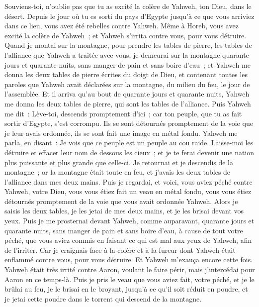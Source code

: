\begin{multicols}{2}
Souviens-toi, n'oublie pas que tu as excité la colère de Yahweh, ton Dieu, dans le désert. Depuis le jour où tu es sorti du pays d'Egypte jusqu'à ce que vous arriviez dans ce lieu, vous avez été rebelles contre Yahweh.
Même à Horeb, vous avez excité la colère de Yahweh~; et Yahweh s'irrita contre vous, pour vous détruire.
Quand je montai sur la montagne, pour prendre les tables de pierre, les tables de l'alliance que Yahweh a traitée avec vous, je demeurai sur la montagne quarante jours et quarante nuits, sans manger de pain et sans boire d'eau~;
et Yahweh me donna les deux tables de pierre écrites du doigt de Dieu, et contenant toutes les paroles que Yahweh avait déclarées sur la montagne, du milieu du feu, le jour de l'assemblée.
Et il arriva qu'au bout de quarante jours et quarante nuits, Yahweh me donna les deux tables de pierre, qui sont les tables de l'alliance.
Puis Yahweh me dit~: Lève-toi, descends promptement d'ici~; car ton peuple, que tu as fait sortir d'Egypte, s'est corrompu. Ils se sont détournés promptement de la voie que je leur avais ordonnée, ils se sont fait une image en métal fondu.
Yahweh me parla, en disant~: Je vois que ce peuple est un peuple au cou raide.
Laisse-moi les détruire et effacer leur nom de dessous les cieux~; et je te ferai devenir une nation plus puissante et plus grande que celle-ci.
Je retournai et je descendis de la montagne~; or la montagne était toute en feu, et j'avais les deux tables de l'alliance dans mes deux mains.
Puis je regardai, et voici, vous aviez péché contre Yahweh, votre Dieu, vous vous étiez fait un veau en métal fondu, vous vous étiez détournés promptement de la voie que vous avait ordonnée Yahweh.
Alors je saisis les deux tables, je les jetai de mes deux mains, et je les brisai devant vos yeux.
Puis je me prosternai devant Yahweh, comme auparavant, quarante jours et quarante nuits, sans manger de pain et sans boire d'eau, à cause de tout votre péché, que vous aviez commis en faisant ce qui est mal aux yeux de Yahweh, afin de l'irriter.
Car je craignais face à la colère et à la fureur dont Yahweh était enflammé contre vous, pour vous détruire. Et Yahweh m'exauça encore cette fois.
Yahweh était très irrité contre Aaron, voulant le faire périr, mais j'intercédai pour Aaron en ce temps-là.
Puis je pris le veau que vous aviez fait, votre péché, et je le brûlai au feu, je le brisai en le broyant, jusqu'à ce qu'il soit réduit en poudre, et je jetai cette poudre dans le torrent qui descend de la montagne.

\end{multicols}
